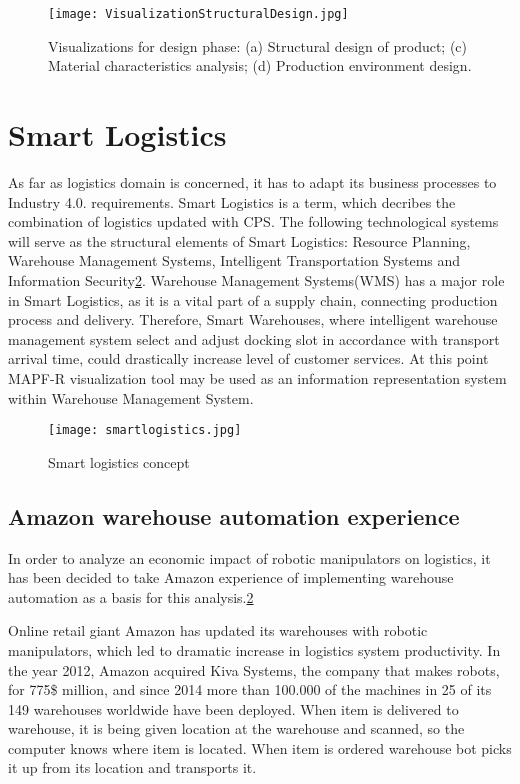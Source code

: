 \documentclass[thesis=B,english]{FITthesis}[2019/12/23]
\begin{document}
\begin{figure}
	\texttt{[image: VisualizationStructuralDesign.jpg]}
	\caption[Visualizations for design phase: (a) Structural design of product; (c) Material characteristics analysis; (d) Production environment design.]{Visualizations for design phase: (a) Structural design of product; (c) Material characteristics analysis; (d) Production environment design.}\label{fig:float42}
\end{figure} 



\section{Smart Logistics}

As far as logistics domain is concerned, it has to adapt its business processes to Industry 4.0. requirements. Smart Logistics is a term, which decribes the combination of logistics updated with CPS. The following technological systems will serve as the  structural elements of Smart Logistics: Resource Planning, Warehouse Management Systems, Intelligent Transportation Systems and Information Security\ref{fig:float43}. Warehouse Management Systems(WMS) has a major role in Smart Logistics, as it is a vital part of a supply chain, connecting production process and delivery. Therefore, Smart Warehouses, where intelligent warehouse management system select and adjust docking slot in accordance with transport arrival time, could drastically increase level of customer services. At this point MAPF-R visualization tool may be used as an information representation system within Warehouse Management System.\cite{bib_7}

\begin{figure}
	\texttt{[image: smartlogistics.jpg]}
	\caption[Smart logistics]{Smart logistics concept}\label{fig:float43}
\end{figure}


\subsection{Amazon warehouse automation experience}

In order to analyze an economic impact of robotic manipulators on logistics, it has been decided to take Amazon experience of implementing warehouse automation as a basis for this analysis.\ref{fig:float43}

Online retail giant Amazon has updated its warehouses with robotic manipulators, which led to dramatic increase in logistics system productivity. In the year 2012, Amazon acquired Kiva Systems, the company that makes robots, for 775\$ million, and since 2014 more than 100.000 of the machines in 25 of its 149 warehouses worldwide have been deployed. When item is delivered to warehouse, it is being given location at the warehouse and scanned, so the computer knows where item is located. When item is ordered warehouse bot picks it up from its location and transports it. 
\end{document}
